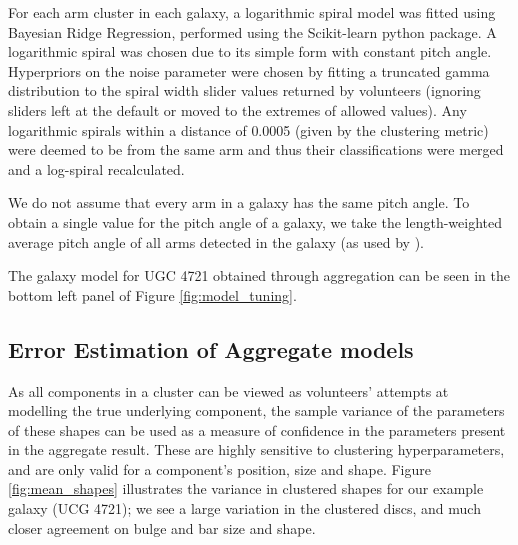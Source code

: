 \documentclass[trackchanges]{aastex63}
\begin{document}
\begin{figure*}
  \caption{Calculated aggregate components for UGC 4721. The aggregate disc is shown using a dot-dashed line and blue fill in the upper left panel, the aggregate bulge with a dotted line and orange fill in the upper right panel, the aggregate bar using a dashed line and green fill in the lower left panel and the aggregate spiral arms are plotted as red lines in the lower right panel. S\'ersic components are displayed at twice their effective radii. Black crosses in the lower right panel indicate spiral arm points that were identified as outliers and removed during cleaning (described in Section \ref{sec:spiral_clustering}). The aggregated components agree well with the underlying morphology, despite the noisiness of the classifications received.}
  \label{fig:mean_shapes}
\end{figure*}


For each arm cluster in each galaxy, a logarithmic spiral model was fitted using Bayesian Ridge Regression, performed using the Scikit-learn python package. A logarithmic spiral was chosen due to its simple form with constant pitch angle. Hyperpriors on the noise parameter were chosen by fitting a truncated gamma distribution \citep{2014arXiv1401.0287Z} to the spiral width slider values returned by volunteers (ignoring sliders left at the default or moved to the extremes of allowed values). Any logarithmic spirals within a distance of 0.0005 (given by the clustering metric) were deemed to be from the same arm and thus their classifications were merged and a log-spiral recalculated.

We do not assume that every arm in a galaxy has the same pitch angle. To obtain a single value for the pitch angle of a galaxy, we take the length-weighted average pitch angle of all arms detected in the galaxy (as used by \citealt{Davis2014:1402.1910v1}).

The galaxy model for UGC 4721 obtained through aggregation can be seen in the bottom left panel of Figure \ref{fig:model_tuning}.


\subsection{Error Estimation of Aggregate models}
\label{sec:error_estimation}

As all components in a cluster can be viewed as volunteers' attempts at modelling the true underlying component, the sample variance of the parameters of these shapes can be used as a measure of confidence in the parameters present in the aggregate result. These are highly sensitive to clustering hyperparameters, and are only valid for a component's position, size and shape. Figure \ref{fig:mean_shapes} illustrates the variance in clustered shapes for our example galaxy (UCG 4721); we see a large variation in the clustered discs, and much closer agreement on bulge and bar size and shape.
\end{document}
